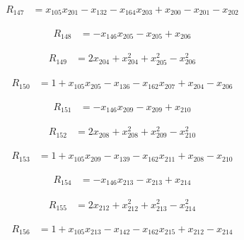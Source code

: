 \begin{align*}
R_{147} &= x_{105} x_{201} -x_{132} -x_{164} x_{203} +x_{200} -x_{201} -x_{202}
\end{align*}

\begin{align*}
R_{148} &= -x_{146} x_{205} -x_{205} +x_{206}
\end{align*}

\begin{align*}
R_{149} &= 2 x_{204} +x_{204}^{2} +x_{205}^{2} -x_{206}^{2}
\end{align*}

\begin{align*}
R_{150} &= 1 +x_{105} x_{205} -x_{136} -x_{162} x_{207} +x_{204} -x_{206}
\end{align*}

\begin{align*}
R_{151} &= -x_{146} x_{209} -x_{209} +x_{210}
\end{align*}

\begin{align*}
R_{152} &= 2 x_{208} +x_{208}^{2} +x_{209}^{2} -x_{210}^{2}
\end{align*}

\begin{align*}
R_{153} &= 1 +x_{105} x_{209} -x_{139} -x_{162} x_{211} +x_{208} -x_{210}
\end{align*}

\begin{align*}
R_{154} &= -x_{146} x_{213} -x_{213} +x_{214}
\end{align*}

\begin{align*}
R_{155} &= 2 x_{212} +x_{212}^{2} +x_{213}^{2} -x_{214}^{2}
\end{align*}

\begin{align*}
R_{156} &= 1 +x_{105} x_{213} -x_{142} -x_{162} x_{215} +x_{212} -x_{214}
\end{align*}

